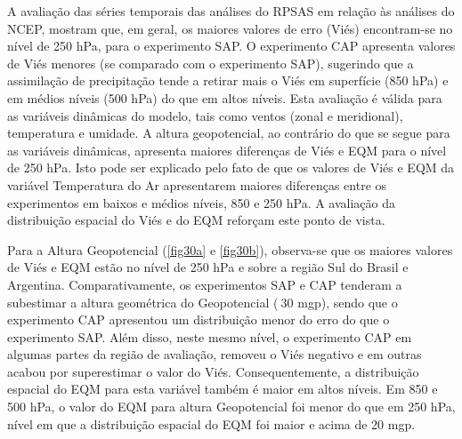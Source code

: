 A avaliação das séries temporais das análises do RPSAS em relação às análises do NCEP, mostram que, em geral, os maiores valores de erro (Viés) encontram-se no nível de 250 hPa, para o experimento SAP. O experimento CAP apresenta valores de Viés menores (se comparado com o experimento SAP), sugerindo que a assimilação de precipitação tende a retirar mais o Viés em superfície (850 hPa) e em médios níveis (500 hPa) do que em altos níveis. Esta avaliação é válida para as variáveis dinâmicas do modelo, tais como ventos (zonal e meridional), temperatura e umidade. A altura geopotencial, ao contrário do que se segue para as variáveis dinâmicas, apresenta maiores diferenças de Viés e EQM para o nível de 250 hPa. Isto pode ser explicado pelo fato de que os valores de Viés e EQM da variável Temperatura do Ar apresentarem maiores diferenças entre os experimentos em baixos e médios níveis, 850 e 250 hPa. A avaliação da distribuição espacial do Viés e do EQM reforçam este ponto de vista. 

Para a Altura Geopotencial (\autoref{fig30a} e \autoref{fig30b}), observa-se que os maiores valores de Viés e EQM estão no nível de 250 hPa e sobre a região Sul do Brasil e Argentina. Comparativamente, os experimentos SAP e CAP tenderam a subestimar a altura geométrica do Geopotencial ($~$30 mgp), sendo que o experimento CAP apresentou um distribuição menor do erro do que o experimento SAP. Além disso, neste mesmo nível, o experimento CAP em algumas partes da região de avaliação, removeu o Viés negativo e em outras acabou por superestimar o valor do Viés. Consequentemente, a distribuição espacial do EQM para esta variável também é maior em altos níveis. Em 850 e 500 hPa, o valor do EQM para altura Geopotencial foi menor do que em 250 hPa, nível em que a distribuição espacial do EQM foi maior e acima de 20 mgp.

